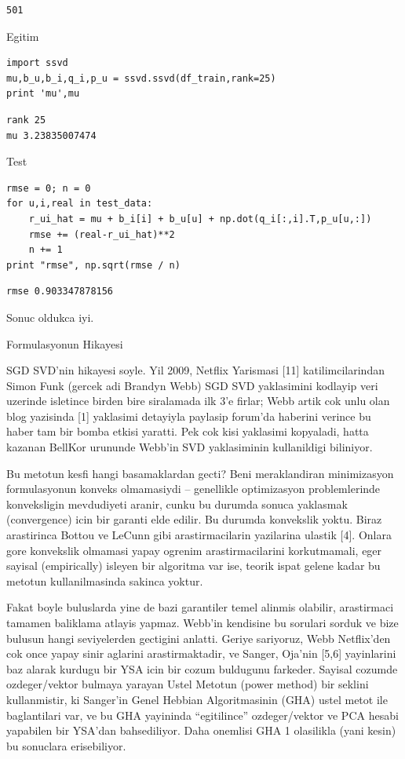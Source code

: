 \documentclass[12pt,fleqn]{article}\usepackage{../common}
\begin{document}
\begin{verbatim}
501
\end{verbatim}

Egitim

\begin{verbatim}
import ssvd
mu,b_u,b_i,q_i,p_u = ssvd.ssvd(df_train,rank=25)
print 'mu',mu
\end{verbatim}

\begin{verbatim}
rank 25
mu 3.23835007474
\end{verbatim}

Test

\begin{verbatim}
rmse = 0; n = 0
for u,i,real in test_data:
    r_ui_hat = mu + b_i[i] + b_u[u] + np.dot(q_i[:,i].T,p_u[u,:])
    rmse += (real-r_ui_hat)**2
    n += 1
print "rmse", np.sqrt(rmse / n)
\end{verbatim}

\begin{verbatim}
rmse 0.903347878156
\end{verbatim}

Sonuc oldukca iyi.

Formulasyonun Hikayesi

SGD SVD'nin hikayesi soyle. Yil 2009, Netflix Yarismasi [11]
katilimcilarindan Simon Funk (gercek adi Brandyn Webb) SGD SVD yaklasimini
kodlayip veri uzerinde isletince birden bire siralamada ilk 3'e firlar;
Webb artik cok unlu olan blog yazisinda [1] yaklasimi detayiyla paylasip
forum'da haberini verince bu haber tam bir bomba etkisi yaratti. Pek cok
kisi yaklasimi kopyaladi, hatta kazanan BellKor urununde Webb'in SVD
yaklasiminin kullanildigi biliniyor.

Bu metotun kesfi hangi basamaklardan gecti? Beni meraklandiran minimizasyon
formulasyonun konveks olmamasiydi -- genellikle optimizasyon problemlerinde
konveksligin mevdudiyeti aranir, cunku bu durumda sonuca yaklasmak
(convergence) icin bir garanti elde edilir. Bu durumda konvekslik
yoktu. Biraz arastirinca Bottou ve LeCunn gibi arastirmacilarin yazilarina
ulastik [4]. Onlara gore konvekslik olmamasi yapay ogrenim
arastirmacilarini korkutmamali, eger sayisal (empirically) isleyen bir
algoritma var ise, teorik ispat gelene kadar bu metotun kullanilmasinda
sakinca yoktur.

Fakat boyle buluslarda yine de bazi garantiler temel alinmis olabilir,
arastirmaci tamamen baliklama atlayis yapmaz. Webb'in kendisine bu sorulari
sorduk ve bize bulusun hangi seviyelerden gectigini anlatti. Geriye
sariyoruz, Webb Netflix'den cok once yapay sinir aglarini arastirmaktadir,
ve Sanger, Oja'nin [5,6] yayinlarini baz alarak kurdugu bir YSA icin bir
cozum buldugunu farkeder. Sayisal cozumde ozdeger/vektor bulmaya yarayan
Ustel Metotun (power method) bir seklini kullanmistir, ki Sanger'in Genel
Hebbian Algoritmasinin (GHA) ustel metot ile baglantilari var, ve bu GHA
yayininda ``egitilince'' ozdeger/vektor ve PCA hesabi yapabilen bir YSA'dan
bahsediliyor. Daha onemlisi GHA 1 olasilikla (yani kesin) bu sonuclara
erisebiliyor.
\end{document}
